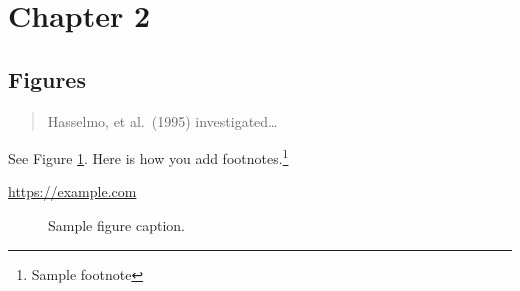 \section{Chapter 2}

\subsection{Figures}

\lipsum[10]
\begin{quote}
  Hasselmo, et al.\ (1995) investigated\dots
\end{quote}

See Figure \ref{fig:fig1}. Here is how you add footnotes.\footnote{Sample footnote}

\lipsum[2]

\begin{center}
  \url{https://example.com}
\end{center}

\begin{figure}
  \centering
  \fbox{\rule[-.5cm]{4cm}{4cm} \rule[-.5cm]{4cm}{0cm}}
  \caption{Sample figure caption.}
  \label{fig:fig1}
\end{figure}


\lipsum[9]
